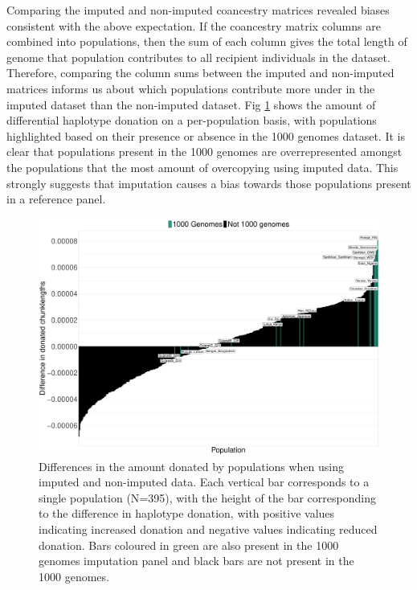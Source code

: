 Comparing the imputed and non-imputed coancestry matrices revealed biases consistent with the above expectation. If the coancestry matrix columns are combined into populations, then the sum of each column gives the total length of genome that population contributes to all recipient individuals in the dataset. Therefore, comparing the column sums between the imputed and non-imputed matrices informs us about which populations contribute more under in the imputed dataset than the non-imputed dataset. Fig \ref{fig:imputed_excess_copying_pops} shows the amount of differential haplotype donation on a per-population basis, with populations highlighted based on their presence or absence in the 1000 genomes dataset. It is clear that populations present in the 1000 genomes are overrepresented amongst the populations that the most amount of overcopying using imputed data. This strongly suggests that imputation causes a bias towards those populations present in a reference panel. 

\begin{figure}
	    \centering
	    \includegraphics[width=1.0\textwidth]{../images/chapter3/imputed_excess_copying_pops.pdf}
	    \caption{Differences in the amount donated by populations when using imputed and non-imputed data. Each vertical bar corresponds to a single population (N=395), with the height of the bar corresponding to the difference in haplotype donation, with positive values indicating increased donation and negative values indicating reduced donation. Bars coloured in green are also present in the 1000 genomes imputation panel and black bars are not present in the 1000 genomes.}
	    \label{fig:imputed_excess_copying_pops}
\end{figure}

